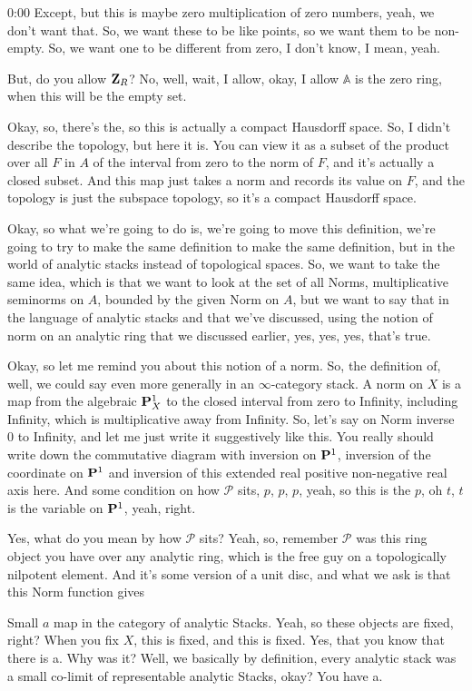\begin{unfinished}{0:00}
Except, but this is maybe zero multiplication of zero numbers, yeah, we don't want that. So, we want these to be like points, so we want them to be non-empty. So, we want one to be different from zero, I don't know, I mean, yeah.

But, do you allow $\Z_R$? No, well, wait, I allow, okay, I allow $\mathbb{A}$ is the zero ring, when this will be the empty set.

Okay, so, there's the, so this is actually a compact Hausdorff space. So, I didn't describe the topology, but here it is. You can view it as a subset of the product over all $F$ in $A$ of the interval from zero to the norm of $F$, and it's actually a closed subset. And this map just takes a norm and records its value on $F$, and the topology is just the subspace topology, so it's a compact Hausdorff space.

Okay, so what we're going to do is, we're going to move this definition, we're going to try to make the same definition to make the same definition, but in the world of analytic stacks instead of topological spaces. So, we want to take the same idea, which is that we want to look at the set of all Norms, multiplicative seminorms on $A$, bounded by the given Norm on $A$, but we want to say that in the language of analytic stacks and that we've discussed, using the notion of norm on an analytic ring that we discussed earlier, yes, yes, yes, that's true.

Okay, so let me remind you about this notion of a norm. So, the definition of, well, we could say even more generally in an $\infty$-category stack. A norm on $X$ is a map from the algebraic $\P^1_X$ to the closed interval from zero to Infinity, including Infinity, which is multiplicative away from Infinity. So, let's say on Norm inverse $0$ to Infinity, and let me just write it suggestively like this. You really should write down the commutative diagram with inversion on $\P^1$, inversion of the coordinate on $\P^1$ and inversion of this extended real positive non-negative real axis here. And some condition on how $\mathcal{P}$ sits, $p$, $p$, $p$, yeah, so this is the $p$, oh $t$, $t$ is the variable on $\P^1$, yeah, right.

Yes, what do you mean by how $\mathcal{P}$ sits? Yeah, so, remember $\mathcal{P}$ was this ring object you have over any analytic ring, which is the free guy on a topologically nilpotent element. And it's some version of a unit disc, and what we ask is that this Norm function gives

Small $a$ map in the category of analytic Stacks. Yeah, so these objects are fixed, right? When you fix $X$, this is fixed, and this is fixed. Yes, that you know that there is a. Why was it? Well, we basically by definition, every analytic stack was a small co-limit of representable analytic Stacks, okay? You have a.


\end{unfinished}
